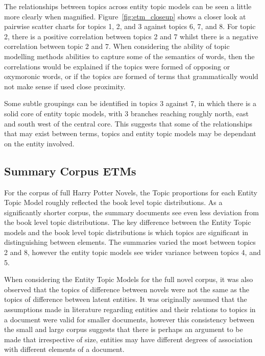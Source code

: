 \documentclass[10pt]{report}
\begin{document}
The relationships between topics across entity topic models can be seen a little more clearly when magnified. Figure~\ref{fig:etm_closeup} shows a closer look at pairwise scatter charts for topics 1, 2, and 3 against topics 6, 7, and 8. For topic 2, there is a positive correlation between topics 2 and 7 whilst there is a negative correlation between topic 2 and 7. When considering the ability of topic modelling methods abilities to capture some of the semantics of words, then the correlations would be explained if the topics were formed of opposing or oxymoronic words, or if the topics are formed of terms that grammatically would not make sense if used close proximity.

Some subtle groupings can be identified in topics 3 against 7, in which there is a solid core of entity topic models, with 3 branches reaching roughly north, east and south west of the central core. This suggests that some of the relationships that may exist between terms, topics and entity topic models may be dependant on the entity involved.

\clearpage
\subsection{Summary Corpus ETMs}

For the corpus of full Harry Potter Novels, the Topic proportions for each Entity Topic Model roughly reflected the book level topic distributions. As a significantly shorter corpus, the summary documents see even less deviation from the book level topic distributions. The key difference between the Entity Topic models and the book level topic distributions is which topics are significant in distinguishing between elements. The summaries varied the most between topics 2 and 8, however the entity topic models see wider variance between topics 4, and 5.

When considering the Entity Topic Models for the full novel corpus, it was also observed that the topics of difference between novels were not the same as the topics of difference between latent entities. It was originally assumed that the assumptions made in literature regarding entities and their relations to topics in a document were valid for smaller documents, however this consistency between the small and large corpus suggests that there is perhaps an argument to be made that irrespective of size, entities may have different degrees of association with different elements of a document.
\end{document}
